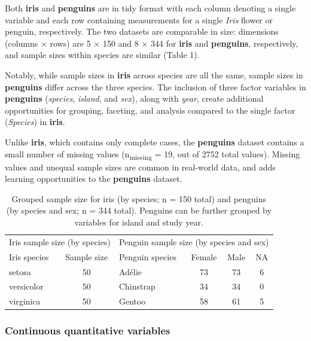 Both \textbf{iris} and \textbf{penguins} are in tidy format
\citep{wickham_tidy_2014} with each column denoting a single variable
and each row containing measurements for a single \emph{Iris} flower or
penguin, respectively. The two datasets are comparable in size:
dimensions (columns × rows) are 5 × 150 and 8 × 344 for \textbf{iris}
and \textbf{penguins}, respectively, and sample sizes within species are
similar (Table 1).

Notably, while sample sizes in \textbf{iris} across species are all the
same, sample sizes in \textbf{penguins} differ across the three species.
The inclusion of three factor variables in \textbf{penguins}
(\emph{species}, \emph{island}, and \emph{sex}), along with \emph{year},
create additional opportunities for grouping, faceting, and analysis
compared to the single factor (\emph{Species}) in \textbf{iris}.

Unlike \textbf{iris}, which contains only complete cases, the
\textbf{penguins} dataset contains a small number of missing values
(n\textsubscript{missing} = 19, out of 2752 total values). Missing
values and unequal sample sizes are common in real-world data, and adds
learning opportunities to the \textbf{penguins} dataset.

\begin{Schunk}
\begin{table}

\caption{\label{tab:counts-tbl}Grouped sample size for iris (by species; n = 150 total) and penguins (by species and sex; n = 344 total). Penguins can be further grouped by variables for island and study year.}
\centering
\begin{tabular}[t]{lclccc}
\toprule
\multicolumn{2}{c}{Iris sample size (by species)} & \multicolumn{4}{c}{Penguin sample size (by species and sex)} \\
\cmidrule(l{3pt}r{3pt}){1-2} \cmidrule(l{3pt}r{3pt}){3-6}
Iris species & Sample size & Penguin species & Female & Male & NA\\
\midrule
setosa & 50 & Adélie & 73 & 73 & 6\\
versicolor & 50 & Chinstrap & 34 & 34 & 0\\
virginica & 50 & Gentoo & 58 & 61 & 5\\
\bottomrule
\end{tabular}
\end{table}

\end{Schunk}

\hypertarget{continuous-quantitative-variables}{%
\subsubsection{Continuous quantitative
variables}\label{continuous-quantitative-variables}}

